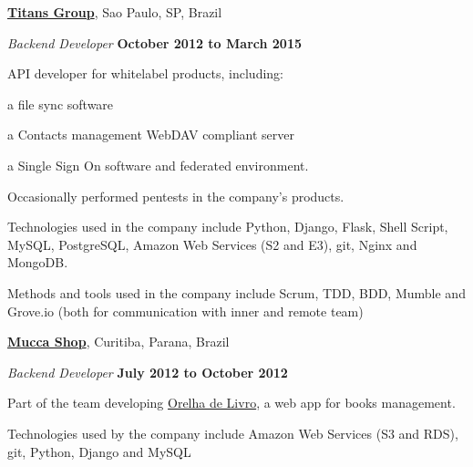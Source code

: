 \documentclass[10pt]{article}
\newenvironment{outerlist}[1][\enskip\textbullet]%
        {\begin{itemize}[#1]}{\end{itemize}%
         \vspace{-.6\baselineskip}}
\newenvironment{innerlist}[1][\enskip\textbullet]%
        {\begin{compactitem}[#1]}{\end{compactitem}}
\newcommand{\blankline}{\quad\pagebreak[2]}
\begin{document}
\href{http://titansgroup.com.br/}{\textbf{Titans Group}},
Sao Paulo, SP, Brazil
\begin{outerlist}

\item[] \textit{Backend Developer}%
        \hfill \textbf{October 2012 to March 2015}
\begin{innerlist}
    \item API developer for whitelabel products, including:
        \begin{innerlist}
            \item a file sync software
            \item a Contacts management WebDAV compliant server
            \item a Single Sign On software and federated environment.
        \end{innerlist}
    \item Occasionally performed pentests in the company's products.

    \item Technologies used in the company include Python, Django, Flask, Shell Script, MySQL, PostgreSQL, Amazon Web Services
    (S2 and E3), git, Nginx and MongoDB.
    \item Methods and tools used in the company include Scrum, TDD, BDD, Mumble and Grove.io (both for communication
    with inner and remote team)
\end{innerlist}

\end{outerlist}

\blankline

\href{http://www.muccashop.com.br/}{\textbf{Mucca Shop}},
Curitiba, Parana, Brazil
\begin{outerlist}

\item[] \textit{Backend Developer}%
        \hfill \textbf{July 2012 to October 2012}
\begin{innerlist}
    \item Part of the team developing \href{http://www.orelhadelivro.com.br/}{Orelha de Livro}, a web
    app for books management.
    \item Technologies used by the company include Amazon Web Services (S3 and RDS), git, Python, Django and MySQL
\end{innerlist}

\end{outerlist}

\blankline
\end{document}
